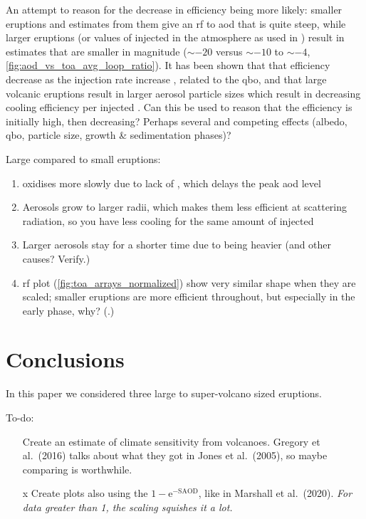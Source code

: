 \documentclass{ametsocV5}
\newcommand{\iso}[1][i]{{#1}njected \ce{SO2}}
\begin{document}
An attempt to reason for the decrease in efficiency being more likely: smaller eruptions
and estimates from them give an \acrshort{rf} to \acrshort{aod} that is quite steep,
while larger eruptions (or values of \iso{} in the atmosphere as used in
\citet{niemeier2015}) result in estimates that are smaller in magnitude (\(\sim-20\)
versus \(\sim-10\) to \(\sim-4\), \cref{fig:aod_vs_toa_avg_loop_ratio}). It has been shown that that efficiency decrease as
the injection rate increase \citep{niemeier2017}, related to the \acrshort{qbo}, and
that large volcanic eruptions result in larger aerosol particle sizes which result in
decreasing cooling efficiency per \iso{} \citep{english2013, timmreck2018}. Can this be
used to reason that the efficiency is initially high, then decreasing? Perhaps several
and competing effects (albedo, \acrshort{qbo}, particle size, growth \& sedimentation
phases)?

Large compared to small eruptions:

\begin{enumerate}
  \item {} oxidises more slowly due to lack of , which delays the peak
        \acrshort{aod} level
  \item Aerosols grow to larger radii, which makes them less efficient at scattering radiation,
        so you have less cooling for the same amount of \iso{}
  \item Larger aerosols stay for a shorter time due to being heavier (and other causes? Verify.)
  \item \acrshort{rf} plot (\cref{fig:toa_arrays_normalized}) show very similar shape
        when they are scaled; smaller eruptions are more efficient throughout, but
        especially in the early phase, why? (.)
\end{enumerate}

\section{Conclusions}


In this paper we considered three large to super-volcano sized eruptions.

\clearpage

To-do:

\begin{itemize}
  \item[\lbrack{}\hphantom{x}\rbrack{}] Create an estimate of climate sensitivity from
    volcanoes. Gregory et al.\ (2016) talks about what they got in Jones et al.\
    (2005), so maybe comparing is worthwhile.
  \item[\lbrack{}x\rbrack{}] Create plots also using the \(1-\mathrm{e}^{-\mathrm{SAOD}}\),
    like in Marshall et al.\ (2020). \emph{For data greater than 1, the scaling squishes
      it a lot.}
\end{itemize}
\end{document}
